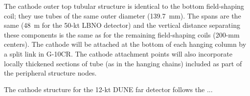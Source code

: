 The cathode outer top tubular structure is identical to the bottom
field-shaping coil; they use tubes of the same outer diameter
(139.7~mm).  The spans are the same (48~m for the 50-kt LBNO detector)
and the vertical distance separating these components is the same as for
the remaining field-shaping coils (200-mm centers). The cathode will be
attached at the bottom of each hanging column by a split link in
G-10CR. The cathode attachment points will also incorporate locally
thickened sections of tube (as in the hanging chains) included as part
of the peripheral structure nodes.


 The cathode structure for the 12-kt DUNE far detector follows the ...
